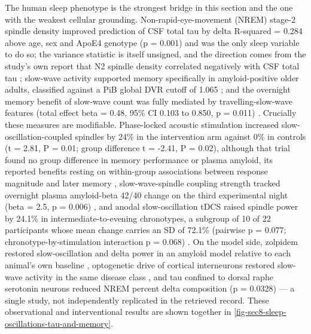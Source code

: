 \documentclass[11pt]{article}
\begin{document}
The human sleep phenotype is the strongest bridge in this section and the one with the weakest cellular grounding. Non-rapid-eye-movement (NREM) stage-2 spindle density improved prediction of CSF total tau by delta R-squared = 0.284 above age, sex and ApoE4 genotype (p = 0.001) and was the only sleep variable to do so; the variance statistic is itself unsigned, and the direction comes from the study's own report that N2 spindle density correlated negatively with CSF total tau \citep{Kam2019}; slow-wave activity supported memory specifically in amyloid-positive older adults, classified against a PiB global DVR cutoff of 1.065 \citep{Zavecz2023}; and the overnight memory benefit of slow-wave count was fully mediated by travelling-slow-wave features (total effect beta = 0.48, 95\% CI 0.103 to 0.850, p = 0.011) \citep{Rouast2026}. Crucially these measures are modifiable. Phase-locked acoustic stimulation increased slow-oscillation-coupled spindles by 24\% in the intervention arm against 0\% in controls (t = 2.81, P = 0.01; group difference t = -2.41, P = 0.02), although that trial found no group difference in memory performance or plasma amyloid, its reported benefits resting on within-group associations between response magnitude and later memory \citep{Wunderlin2023}, slow-wave-spindle coupling strength tracked overnight plasma amyloid-beta 42/40 change on the third experimental night (beta = 2.5, p = 0.006) \citep{Wunderlin2026}, and anodal slow-oscillation tDCS raised spindle power by 24.1\% in intermediate-to-evening chronotypes, a subgroup of 10 of 22 participants whose mean change carries an SD of 72.1\% (pairwise p = 0.077; chronotype-by-stimulation interaction p = 0.068) \citep{Dikici2026}. On the model side, zolpidem restored slow-oscillation and delta power in an amyloid model relative to each animal's own baseline \citep{Yu2026}, optogenetic drive of cortical interneurons restored slow-wave activity in the same disease class \citep{Zhao2023}, and tau confined to dorsal raphe serotonin neurons reduced NREM percent delta composition (p = 0.0328) \citep{Kolling2026} --- a single study, not independently replicated in the retrieved record. These observational and interventional results are shown together in \ref{fig-sec8-sleep-oscillations-tau-and-memory}.
\end{document}
